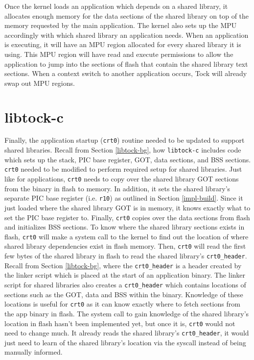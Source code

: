 \documentclass[12pt]{ucsddissertation}
\begin{document}
Once the kernel loads an application which depends on a shared library, it allocates enough memory for the data sections of the shared library on top of the memory requested by the main application. The kernel also sets up the MPU accordingly with which shared library an application needs. When an application is executing, it will have an MPU region allocated for every shared library it is using. This MPU region will have read and execute permissions to allow the application to jump into the sections of flash that contain the shared library text sections. When a context switch to another application occurs, Tock will already swap out MPU regions.


\section{libtock-c} \label{impl-libtock}

Finally, the application startup (\texttt{crt0}) routine needed to be updated to support shared libraries. Recall from Section \ref{libtock-bg}, how \texttt{libtock-c} includes code which sets up the stack, PIC base register, GOT, data sections, and BSS sections. \texttt{crt0} needed to be modified to perform required setup for shared libraries. Just like for applications, \texttt{crt0} needs to copy over the shared library GOT sections from the binary in flash to memory. In addition, it sets the shared library's separate PIC base register (i.e. \texttt{r10}) as outlined in Section \ref{impl-build}. Since it just loaded where the shared library GOT is in memory, it knows exactly what to set the PIC base register to. Finally, \texttt{crt0} copies over the data sections from flash and initializes BSS sections. To know where the shared library sections exists in flash, \texttt{crt0} will make a system call to the kernel to find out the location of where shared library dependencies exist in flash memory. Then, \texttt{crt0} will read the first few bytes of the shared library in flash to read the shared library's \texttt{crt0\_header}. Recall from Section \ref{libtock-bg}, where the \texttt{crt0\_header} is a header created by the linker script which is placed at the start of an application binary. The linker script for shared libraries also creates a \texttt{crt0\_header} which contains locations of sections such as the GOT, data and BSS within the binary. Knowledge of these locations is useful for \texttt{crt0} as it can know exactly where to fetch sections from the app binary in flash. The system call to gain knowledge of the shared library's location in flash hasn't been implemented yet, but once it is, \texttt{crt0} would not need to change much. It already reads the shared library's \texttt{crt0\_header}, it would just need to learn of the shared library's location via the syscall instead of being manually informed.
\end{document}
